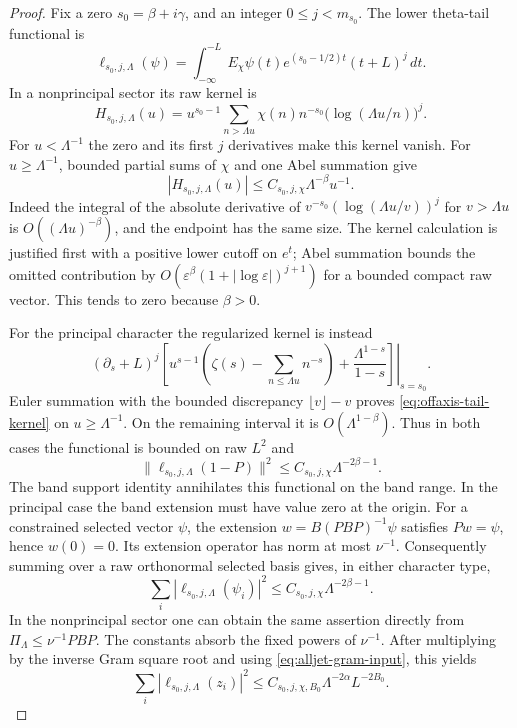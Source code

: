 \begin{proof}
Fix a zero $s_0=\beta+i\gamma$, and an integer $0\leq j<m_{s_0}$.
The lower theta-tail functional is
\[
 \ell_{s_0,j,\Lambda}(\psi)=
 \int_{-\infty}^{-L}E_\chi\psi(t)
 e^{(s_0-1/2)t}(t+L)^j\,dt.
\]
In a nonprincipal sector its raw kernel is
\[
 H_{s_0,j,\Lambda}(u)=
 u^{s_0-1}\sum_{n>\Lambda u}\chi(n)n^{-s_0}
                 \bigl(\log(\Lambda u/n)\bigr)^j.
\]
For $u<\Lambda^{-1}$ the zero and its first $j$ derivatives make this
kernel vanish.  For $u\geq\Lambda^{-1}$, bounded partial sums of
$\chi$ and one Abel summation give
\begin{equation}\label{eq:offaxis-tail-kernel}
 |H_{s_0,j,\Lambda}(u)|\leq C_{s_0,j,\chi}\Lambda^{-\beta}u^{-1}.
\end{equation}
Indeed the integral of the absolute derivative of
$v^{-s_0}(\log(\Lambda u/v))^j$ for $v>\Lambda u$ is
$O((\Lambda u)^{-\beta})$, and the endpoint has the same size.
The kernel calculation is justified first with a positive lower
cutoff on $e^t$; Abel summation bounds the omitted contribution by
$O(\varepsilon^\beta(1+|\log\varepsilon|)^{j+1})$ for a bounded
compact raw vector.  This tends to zero because $\beta>0$.

For the principal character the regularized kernel is instead
\[
 \left.(\partial_s+L)^j
 \left[u^{s-1}\left(\zeta(s)-\sum_{n\leq\Lambda u}n^{-s}\right)
             +\frac{\Lambda^{1-s}}{1-s}\right]\right|_{s=s_0}.
\]
Euler summation with the bounded discrepancy $\lfloor v\rfloor-v$
proves \eqref{eq:offaxis-tail-kernel} on $u\geq\Lambda^{-1}$.
On the remaining interval it is $O(\Lambda^{1-\beta})$.
Thus in both cases the functional is bounded on raw $L^2$ and
\[
 \|\ell_{s_0,j,\Lambda}(1-P)\|^2
                  \leq C_{s_0,j,\chi}\Lambda^{-2\beta-1}.
\]
The band support identity annihilates this functional on the band
range.  In the principal case the band extension must have value
zero at the origin.  For a constrained selected vector $\psi$, the
extension $w=B(PBP)^{-1}\psi$ satisfies $Pw=\psi$, hence $w(0)=0$.
Its extension operator has norm at most $\nu^{-1}$.
Consequently summing over a raw orthonormal selected basis gives,
in either character type,
\[
 \sum_i|\ell_{s_0,j,\Lambda}(\psi_i)|^2
                   \leq C_{s_0,j,\chi}\Lambda^{-2\beta-1}.
\]
In the nonprincipal sector one can obtain the same assertion directly
from $\Pi_\Lambda\leq\nu^{-1}PBP$.
The constants absorb the fixed powers of $\nu^{-1}$.
After multiplying by the inverse Gram square root and using
\eqref{eq:alljet-gram-input}, this yields
\begin{equation}\label{eq:offaxis-tail-normalized}
 \sum_i|\ell_{s_0,j,\Lambda}(z_i)|^2
 \leq C_{s_0,j,\chi,B_0}\Lambda^{-2\alpha}L^{-2B_0}.
\end{equation}


\end{proof}
